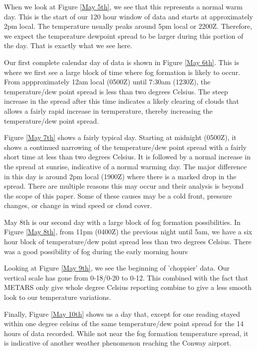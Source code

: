 \documentclass{article}
\begin{document}
\noindent
When we look at Figure \ref{May 5th}, we see that this represents a normal warm day. This is the start of our 120 hour window of data and starts at approximately 2pm local. The temperature usually peaks around 5pm local or 2200Z. Therefore, we expect the temperature dewpoint spread to be larger during this portion of the day. That is exactly what we see here.


\noindent
Our first complete calendar day of data is shown in Figure \ref{May 6th}. This is where we first see a large block of time where fog formation is likely to occur. From appproximately 12am local (0500Z) until 7:30am (1230Z), the temperature/dew point spread is less than two degrees Celsius. The steep increase in the spread after this time indicates a likely clearing of clouds that allows a fairly rapid increase in termperature, thereby increasing the temperature/dew point spread.

\noindent
Figure \ref{May 7th} shows a fairly typical day. Starting at midnight (0500Z), it shows a continued narrowing of the temperature/dew point spread with a fairly short time at less than two degrees Celsius. It is followed by a normal increase in the spread at sunrise, indicative of a normal warming day. The major difference in this day is around 2pm local (1900Z) where there is a marked drop in the spread. There are multiple reasons this may occur and their analysis is beyond the scope of this paper. Some of these causes may be a cold front, pressure changes, or change in wind speed or cloud cover.

\noindent
May 8th is our second day with a large block of fog formation possibilities. In Figure \ref{May 8th}, from 11pm (0400Z) the previous night until 5am, we have a six hour block of temperature/dew point spread less than two degrees Celsius. There was a good possibility of fog during the early morning hours

\noindent
Looking at Figure \ref{May 9th}, we see the beginning of 'choppier' data. Our vertical scale has gone from 0-18/0-20 to 0-12. This combined with the fact that METARS only give whole degree Celsius reporting combine to give a less smooth look to our temperature variations.

\noindent
Finally, Figure \ref{May 10th} shows us a day that, except for one reading stayed within one degree celsius of the same temperature/dew point spread for the 14 hours of data recorded. While not near the fog formation temperature spread, it is indicative of another weather phenomenon reaching the Conway airport.
\end{document}
